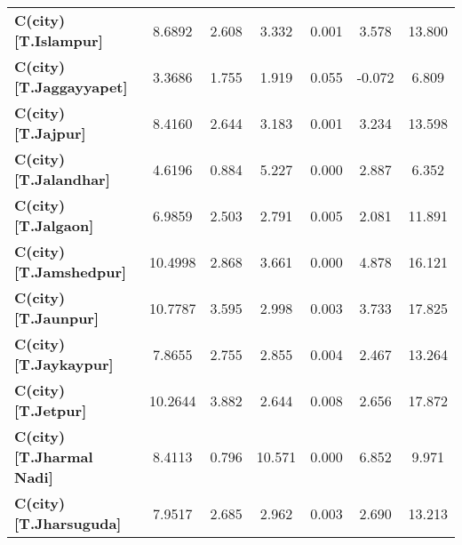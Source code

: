 \begin{center}
\begin{tabular}{lcccccc}
\textbf{C(city)[T.Islampur]}                                                                        &       8.6892  &        2.608     &     3.332  &         0.001        &        3.578    &       13.800     \\
\textbf{C(city)[T.Jaggayyapet]}                                                                     &       3.3686  &        1.755     &     1.919  &         0.055        &       -0.072    &        6.809     \\
\textbf{C(city)[T.Jajpur]}                                                                          &       8.4160  &        2.644     &     3.183  &         0.001        &        3.234    &       13.598     \\
\textbf{C(city)[T.Jalandhar]}                                                                       &       4.6196  &        0.884     &     5.227  &         0.000        &        2.887    &        6.352     \\
\textbf{C(city)[T.Jalgaon]}                                                                         &       6.9859  &        2.503     &     2.791  &         0.005        &        2.081    &       11.891     \\
\textbf{C(city)[T.Jamshedpur]}                                                                      &      10.4998  &        2.868     &     3.661  &         0.000        &        4.878    &       16.121     \\
\textbf{C(city)[T.Jaunpur]}                                                                         &      10.7787  &        3.595     &     2.998  &         0.003        &        3.733    &       17.825     \\
\textbf{C(city)[T.Jaykaypur]}                                                                       &       7.8655  &        2.755     &     2.855  &         0.004        &        2.467    &       13.264     \\
\textbf{C(city)[T.Jetpur]}                                                                          &      10.2644  &        3.882     &     2.644  &         0.008        &        2.656    &       17.872     \\
\textbf{C(city)[T.Jharmal Nadi]}                                                                    &       8.4113  &        0.796     &    10.571  &         0.000        &        6.852    &        9.971     \\
\textbf{C(city)[T.Jharsuguda]}                                                                      &       7.9517  &        2.685     &     2.962  &         0.003        &        2.690    &       13.213     \\

\end{tabular}
\end{center}

